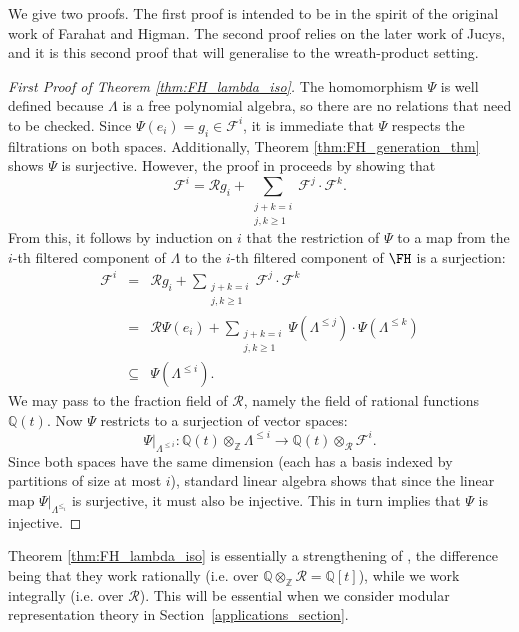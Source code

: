 We give two proofs. The first proof is intended to be in the spirit of the original work of Farahat and Higman. The second proof relies on the later work of Jucys, and it is this second proof that will generalise to the wreath-product setting.
\begin{proof}[First Proof of Theorem \ref{thm:FH_lambda_iso}]
The homomorphism $\Psi$ is well defined because $\Lambda$ is a free polynomial algebra, so there are no relations that need to be checked. Since $\Psi(e_i) = g_i \in \mathcal{F}^i$, it is immediate that $\Psi$ respects the filtrations on both spaces. Additionally, Theorem \ref{thm:FH_generation_thm} shows $\Psi$ is surjective. However, the proof in \cite{FarahatHigman} proceeds by showing that \[
\mathcal{F}^i = \mathcal{R}g_i + \sum_{\substack{j+k = i \\ j,k \geq 1}}\mathcal{F}^j \cdot \mathcal{F}^k.
\]
From this, it follows by induction on $i$ that the restriction of $\Psi$ to a map from the $i$-th filtered component of $\Lambda$ to the $i$-th filtered component of $\FH$ is a surjection:
\begin{eqnarray*}
\mathcal{F}^i &=& \mathcal{R}g_i + \sum_{\substack{j+k = i \\ j,k \geq 1}}\mathcal{F}^j \cdot \mathcal{F}^k \\
&=& \mathcal{R}\Psi(e_i) + \sum_{\substack{j+k = i \\ j,k \geq 1}}\Psi(\Lambda^{\leq j}) \cdot \Psi(\Lambda^{\leq k}) \\
&\subseteq& \Psi(\Lambda^{\leq i}).
\end{eqnarray*}
We may pass to the fraction field of $\mathcal{R}$, namely the field of rational functions $\mathbb{Q}(t)$. Now $\Psi$ restricts to a surjection of vector spaces:
\[
\left.\Psi\right|_{\Lambda^{\leq i}}:
\mathbb{Q}(t) \otimes_{\mathbb{Z}} \Lambda^{\leq i} \to \mathbb{Q}(t) \otimes_{\mathcal{R}} \mathcal{F}^i.
\]
Since both spaces have the same dimension (each has a basis indexed by partitions of size at most $i$), standard linear algebra shows that since the linear map $\left.\Psi\right|_{\Lambda^{\leq_i}}$ is surjective, it must also be injective. This in turn implies that $\Psi$ is injective.
\end{proof}

Theorem \ref{thm:FH_lambda_iso} is essentially a strengthening of \cite[Theorem 3.1]{CorteelGoupilSchaeffer}, the difference being that they work rationally (i.e. over $\mathbb{Q} \otimes_{\mathbb{Z}} \mathcal{R} = \mathbb{Q}[t]$), while we work integrally (i.e. over $\mathcal{R}$). This will be essential when we consider modular representation theory in Section~\ref{applications_section}.

